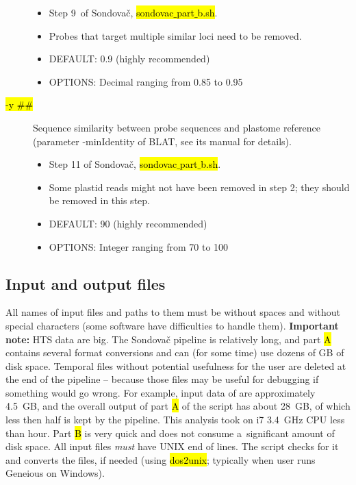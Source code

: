 \documentclass[a4paper, 11pt, twoside]{article}
\renewcommand{\texttt}[1]{\hl{\ttfamily #1}}
\begin{document}
\begin{description}
  \begin{itemize}
    \item Step 9~of Sondovač, \texttt{sondovac$\_$part$\_$b.sh}.
    \item Probes that target multiple similar loci need to be removed.
    \item DEFAULT: 0.9 (highly recommended)
    \item OPTIONS: Decimal ranging from 0.85 to 0.95
  \end{itemize}
\item[\texttt{-y \#\#}] Sequence similarity between probe sequences and plastome reference (parameter -minIde\-ntity of BLAT, see its manual for details).
  \begin{itemize}
    \item Step 11 of Sondovač, \texttt{sondovac$\_$part$\_$b.sh}.
    \item Some plastid reads might not have been removed in step 2; they should be removed in this step.
    \item DEFAULT: 90 (highly recommended)
    \item OPTIONS: Integer ranging from 70 to 100
  \end{itemize}
\end{description}

\subsection{Input and output files}

All names of input files and paths to them must be without spaces and without special characters (some software have difficulties to handle them). \textbf{Important note:} HTS data are big. The Sondovač pipeline is relatively long, and part \texttt{A} contains several format conversions and can (for some time) use dozens of GB of disk space. Temporal files without potential usefulness for the user are deleted at the end of the pipeline -- because those files may be useful for debugging if something would go wrong. For example, input data of \citet{Schmickl2016} are approximately 4.5~GB, and the overall output of part \texttt{A} of the script has about 28~GB, of which less then half is kept by the pipeline. This analysis took on i7 3.4~GHz CPU less than hour. Part \texttt{B} is very quick and does not consume a~significant amount of disk space. All input files \textit{must} have UNIX end of lines. The script checks for it and converts the files, if needed (using \texttt{dos2unix}; typically when user runs Geneious on Windows).
\end{document}
